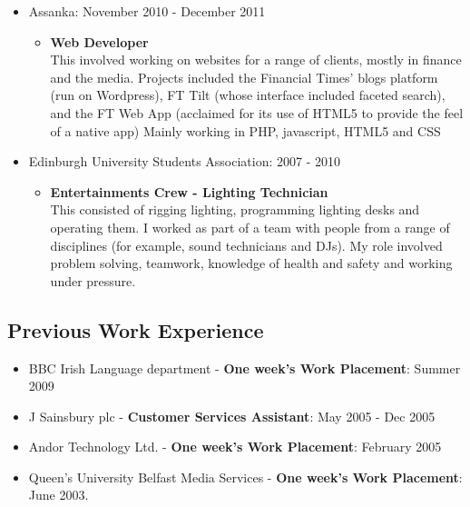 \documentclass[a4paper]{article}
\begin{document}
\begin{itemize}
\item Assanka: November 2010 - December 2011
\begin{itemize}\item
 {\bf Web Developer}\\
This involved working on websites for a range of clients, mostly in finance and the media.  Projects included the Financial Times' blogs platform (run on Wordpress), FT Tilt (whose interface included faceted search), and the FT Web App (acclaimed for its use of HTML5 to provide the feel of a native app)  Mainly working in PHP, javascript, HTML5 and CSS
\end{itemize}

\item Edinburgh University Students Association: 2007 - 2010
\begin{itemize}\item
{\bf  Entertainments Crew - Lighting Technician} \\
This consisted of rigging lighting, programming lighting desks and operating them.  I worked as part of a team with people from a range of disciplines (for example, sound technicians and DJs).  My role involved problem solving, teamwork, knowledge of health and safety and working under pressure.
\end{itemize}


\end{itemize}

\subsection*{Previous Work Experience}
\begin{itemize}

\item BBC Irish Language department - {\bf One week's Work Placement}: Summer 2009
\item J Sainsbury plc - {\bf Customer Services Assistant}: May 2005 - Dec 2005
\item Andor Technology Ltd. - {\bf One week's Work Placement}:  February 2005
\item Queen's University Belfast Media Services - {\bf One week's Work Placement}:  June 2003.


\end{itemize}
\end{document}
